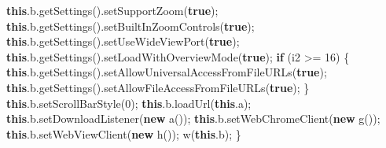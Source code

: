 \documentclass[
]{article}
\newenvironment{Shaded}{}{}
\newcommand{\ControlFlowTok}[1]{\textcolor[rgb]{0.00,0.44,0.13}{\textbf{#1}}}
\newcommand{\DecValTok}[1]{\textcolor[rgb]{0.25,0.63,0.44}{#1}}
\newcommand{\FunctionTok}[1]{\textcolor[rgb]{0.02,0.16,0.49}{#1}}
\newcommand{\KeywordTok}[1]{\textcolor[rgb]{0.00,0.44,0.13}{\textbf{#1}}}
\newcommand{\NormalTok}[1]{#1}
\newcommand{\OperatorTok}[1]{\textcolor[rgb]{0.40,0.40,0.40}{#1}}
\begin{document}
\begin{Shaded}
\begin{Highlighting}[]
        \KeywordTok{this}\OperatorTok{.}\FunctionTok{b}\OperatorTok{.}\FunctionTok{getSettings}\OperatorTok{().}\FunctionTok{setSupportZoom}\OperatorTok{(}\KeywordTok{true}\OperatorTok{);}
        \KeywordTok{this}\OperatorTok{.}\FunctionTok{b}\OperatorTok{.}\FunctionTok{getSettings}\OperatorTok{().}\FunctionTok{setBuiltInZoomControls}\OperatorTok{(}\KeywordTok{true}\OperatorTok{);}
        \KeywordTok{this}\OperatorTok{.}\FunctionTok{b}\OperatorTok{.}\FunctionTok{getSettings}\OperatorTok{().}\FunctionTok{setUseWideViewPort}\OperatorTok{(}\KeywordTok{true}\OperatorTok{);}
        \KeywordTok{this}\OperatorTok{.}\FunctionTok{b}\OperatorTok{.}\FunctionTok{getSettings}\OperatorTok{().}\FunctionTok{setLoadWithOverviewMode}\OperatorTok{(}\KeywordTok{true}\OperatorTok{);}
        \ControlFlowTok{if} \OperatorTok{(}\NormalTok{i2 }\OperatorTok{\textgreater{}=} \DecValTok{16}\OperatorTok{)} \OperatorTok{\{}
            \KeywordTok{this}\OperatorTok{.}\FunctionTok{b}\OperatorTok{.}\FunctionTok{getSettings}\OperatorTok{().}\FunctionTok{setAllowUniversalAccessFromFileURLs}\OperatorTok{(}\KeywordTok{true}\OperatorTok{);}
            \KeywordTok{this}\OperatorTok{.}\FunctionTok{b}\OperatorTok{.}\FunctionTok{getSettings}\OperatorTok{().}\FunctionTok{setAllowFileAccessFromFileURLs}\OperatorTok{(}\KeywordTok{true}\OperatorTok{);}
        \OperatorTok{\}}
        \KeywordTok{this}\OperatorTok{.}\FunctionTok{b}\OperatorTok{.}\FunctionTok{setScrollBarStyle}\OperatorTok{(}\DecValTok{0}\OperatorTok{);}
        \KeywordTok{this}\OperatorTok{.}\FunctionTok{b}\OperatorTok{.}\FunctionTok{loadUrl}\OperatorTok{(}\KeywordTok{this}\OperatorTok{.}\FunctionTok{a}\OperatorTok{);}
        \KeywordTok{this}\OperatorTok{.}\FunctionTok{b}\OperatorTok{.}\FunctionTok{setDownloadListener}\OperatorTok{(}\KeywordTok{new} \FunctionTok{a}\OperatorTok{());}
        \KeywordTok{this}\OperatorTok{.}\FunctionTok{b}\OperatorTok{.}\FunctionTok{setWebChromeClient}\OperatorTok{(}\KeywordTok{new} \FunctionTok{g}\OperatorTok{());}
        \KeywordTok{this}\OperatorTok{.}\FunctionTok{b}\OperatorTok{.}\FunctionTok{setWebViewClient}\OperatorTok{(}\KeywordTok{new} \FunctionTok{h}\OperatorTok{());}
        \FunctionTok{w}\OperatorTok{(}\KeywordTok{this}\OperatorTok{.}\FunctionTok{b}\OperatorTok{);}
    \OperatorTok{\}}


\end{Highlighting}
\end{Shaded}
\end{document}
